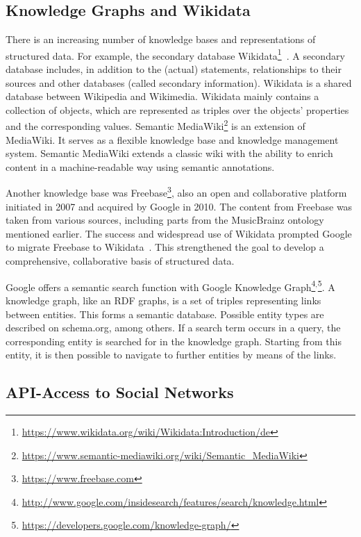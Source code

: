 \documentclass[a4paper,USenglish]{tgdk-v2021}
\newcommand{\myurl}[1]{\footnote{\url{#1}}}
\begin{document}
\subsection{Knowledge Graphs and Wikidata}

There is an increasing number of knowledge bases and representations of structured data.
For example, the secondary database Wikidata\myurl{https://www.wikidata.org/wiki/Wikidata:Introduction/de}~\cite{DBLP:journals/cacm/VrandecicK14}.
A secondary database includes, in addition to the (actual) statements, relationships to their sources and other databases (called secondary information). 
Wikidata is a shared database between Wikipedia and Wikimedia. 
Wikidata mainly contains a collection of objects, which are represented as triples over the objects' properties and the corresponding values. 
Semantic MediaWiki\myurl{https://www.semantic-mediawiki.org/wiki/Semantic_MediaWiki} is an extension of MediaWiki. 
It serves as a flexible knowledge base and knowledge management system. 
Semantic MediaWiki extends a classic wiki with the ability to enrich content in a machine-readable way using semantic annotations. 
  
Another knowledge base was Freebase\myurl{https://www.freebase.com}, also an open and collaborative platform initiated in 2007 and acquired by Google in 2010.
The content from Freebase was taken from various sources, including parts from the MusicBrainz ontology mentioned earlier.
The success and widespread use of Wikidata prompted Google to migrate Freebase to Wikidata~\cite{DBLP:conf/www/TanonVSSP16}.
This strengthened the goal to develop a comprehensive, collaborative basis of structured data.

Google offers a semantic search function with Google Knowledge Graph\myurl{http://www.google.com/insidesearch/features/search/knowledge.html}$^,$\myurl{https://developers.google.com/knowledge-graph/}.
A knowledge graph, like an RDF graphs, is a set of triples representing links between entities.
This forms a semantic database.
Possible entity types are described on schema.org, among others.
If a search term occurs in a query, the corresponding entity is searched for in the knowledge graph. 
Starting from this entity, it is then possible to navigate to further entities by means of the links. 

\subsection{API-Access to Social Networks} 
\end{document}
